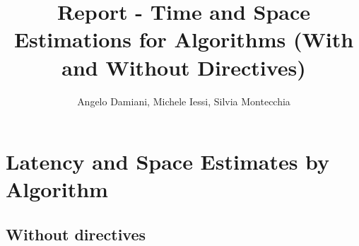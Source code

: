 \documentclass[12pt,a4paper]{report}
\begin{document}
	
	\title{Report - Time and Space Estimations for Algorithms (With and Without Directives)}
	\author{Angelo Damiani, Michele Iessi, Silvia Montecchia}
	\maketitle
	
	\chapter*{Latency and Space Estimates by Algorithm}

\section*{Without directives}


\end{document}
